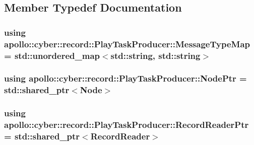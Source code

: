 \subsection{Member Typedef Documentation}
\hypertarget{classapollo_1_1cyber_1_1record_1_1PlayTaskProducer_add93e531edd181faebfd9917c0c3930e}{
\subsubsection[{Message\-Type\-Map}]{\setlength{\rightskip}{0pt plus 5cm}using {\bf apollo\-::cyber\-::record\-::\-Play\-Task\-Producer\-::\-Message\-Type\-Map} =  std\-::unordered\-\_\-map$<$std\-::string, std\-::string$>$}}\label{classapollo_1_1cyber_1_1record_1_1PlayTaskProducer_add93e531edd181faebfd9917c0c3930e}
\hypertarget{classapollo_1_1cyber_1_1record_1_1PlayTaskProducer_a60273f70488f8bb52d6112a32ec502bb}{
\subsubsection[{Node\-Ptr}]{\setlength{\rightskip}{0pt plus 5cm}using {\bf apollo\-::cyber\-::record\-::\-Play\-Task\-Producer\-::\-Node\-Ptr} =  std\-::shared\-\_\-ptr$<${\bf Node}$>$}}\label{classapollo_1_1cyber_1_1record_1_1PlayTaskProducer_a60273f70488f8bb52d6112a32ec502bb}
\hypertarget{classapollo_1_1cyber_1_1record_1_1PlayTaskProducer_a06a6d2bd59dd7225b3ea570fcc391b14}{
\subsubsection[{Record\-Reader\-Ptr}]{\setlength{\rightskip}{0pt plus 5cm}using {\bf apollo\-::cyber\-::record\-::\-Play\-Task\-Producer\-::\-Record\-Reader\-Ptr} =  std\-::shared\-\_\-ptr$<${\bf Record\-Reader}$>$}}\label{classapollo_1_1cyber_1_1record_1_1PlayTaskProducer_a06a6d2bd59dd7225b3ea570fcc391b14}
